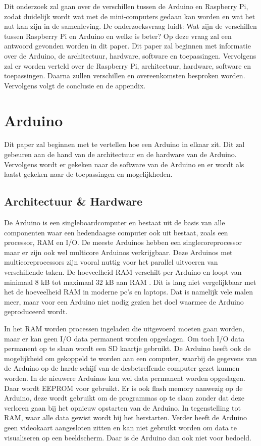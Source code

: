 \documentclass[a4paper, dutch, abstract=true]{scrartcl}
\begin{document}
Dit onderzoek zal gaan over de verschillen tussen de Arduino en Raspberry Pi, zodat duidelijk wordt
wat met de mini-computers gedaan kan worden en wat het nut kan zijn in de samenleving.
De onderzoeksvraag luidt: Wat zijn de verschillen tussen Raspberry Pi en Arduino en welke is beter?
Op deze vraag zal een antwoord gevonden worden in dit paper.
Dit paper zal beginnen met informatie over de Arduino, de architectuur, hardware, software en
toepassingen.
Vervolgens zal er worden verteld over de Raspberry Pi, architectuur, hardware, software en
toepassingen.
Daarna zullen verschillen en overeenkomsten besproken worden.
Vervolgens volgt de conclusie en de appendix.

\section{Arduino}
Dit paper zal beginnen met te vertellen hoe een Arduino in elkaar zit.
Dit zal gebeuren aan de hand van de architectuur en de hardware van de Arduino.
Vervolgens wordt er gekeken naar de software van de Arduino en er wordt als laatst gekeken naar de
toepassingen en mogelijkheden.

\subsection{Architectuur \& Hardware}
De Arduino is een singleboardcomputer en bestaat uit de basis van alle componenten waar een
hedendaagse computer ook uit bestaat, zoals een processor, RAM en I/O.
De meeste Arduinos hebben een singlecoreprocessor maar er zijn ook wel multicore Arduinos
verkrijgbaar.
Deze Arduinos met multicoreprocessors zijn vooral nuttig voor het parallel uitvoeren van
verschillende taken.
De hoeveelheid RAM verschilt per Arduino en loopt van minimaal 8 kB tot maximaal 32 kB aan RAM
\cite{arduino2019products}.
Dit is lang niet vergelijkbaar met het de hoeveelheid RAM in moderne pc's en laptops.
Dat is namelijk vele malen meer, maar voor een Arduino niet nodig gezien het doel waarmee de Arduino
geproduceerd wordt.

In het RAM worden processen ingeladen die uitgevoerd moeten gaan worden, maar er kan geen I/O data
permanent worden opgeslagen. 
Om toch I/O data permanent op te slaan wordt een SD kaartje gebruikt.  
De Arduino heeft ook de mogelijkheid om gekoppeld te worden aan een computer, waarbij de gegevens
van de Arduino op de harde schijf van de desbetreffende computer gezet kunnen worden.
In de nieuwere Arduinos kan wel data permanent worden opgeslagen. Daar wordt EEPROM voor gebruikt.
Er is ook flash memory aanwezig op de Arduino, deze wordt gebruikt om de programmas op te slaan 
zonder dat deze verloren gaan bij het opnieuw opstarten van de Arduino.
In tegenstelling tot RAM, waar alle data gewist wordt bij het herstarten.
Verder heeft de Arduino geen videokaart aangesloten zitten en kan niet gebruikt worden om data te visualiseren op een beeldscherm.
Daar is de Arduino dan ook niet voor bedoeld.
\end{document}
